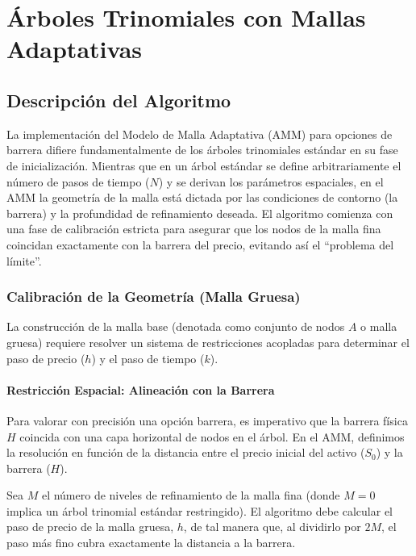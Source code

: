 \section{Árboles Trinomiales con Mallas Adaptativas}
\label{sec:impl_arboles_mallas}

\subsection{Descripción del Algoritmo}
\label{subsec:algoritmo_arboles_mallas}

La implementación del Modelo de Malla Adaptativa (AMM) para opciones de barrera difiere fundamentalmente de los árboles trinomiales estándar en su fase de inicialización. Mientras que en un árbol estándar se define arbitrariamente el número de pasos de tiempo ($N$) y se derivan los parámetros espaciales, en el AMM la geometría de la malla está dictada por las condiciones de contorno (la barrera) y la profundidad de refinamiento deseada.
El algoritmo comienza con una fase de calibración estricta para asegurar que los nodos de la malla fina coincidan exactamente con la barrera del precio, evitando así el ``problema del límite''.

\subsubsection{Calibración de la Geometría (Malla Gruesa)}

La construcción de la malla base (denotada como conjunto de nodos $A$ o malla gruesa) requiere resolver un sistema de restricciones acopladas para determinar el paso de precio ($h$) y el paso de tiempo ($k$).

\paragraph{Restricción Espacial: Alineación con la Barrera} 

Para valorar con precisión una opción barrera, es imperativo que la barrera física $H$ coincida con una capa horizontal de nodos en el árbol. En el AMM, definimos la resolución en función de la distancia entre el precio inicial del activo ($S_0$) y la barrera ($H$).

Sea $M$ el número de niveles de refinamiento de la malla fina (donde $M=0$ implica un árbol trinomial estándar restringido). El algoritmo debe calcular el paso de precio de la malla gruesa, $h$, de tal manera que, al dividirlo por $2M$, el paso más fino cubra exactamente la distancia a la barrera.

